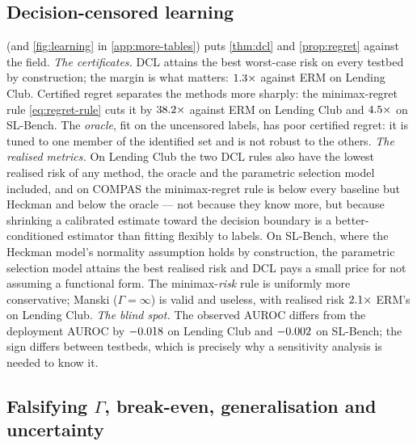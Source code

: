 \subsection{Decision-censored learning}
\label{sec:exp-learning}



 (and \cref{fig:learning} in \cref{app:more-tables}) puts \cref{thm:dcl} and
\cref{prop:regret} against the field. \emph{The certificates.} DCL attains the
best worst-case risk on every testbed by construction; the margin is what
matters: $1.3\times$ against ERM on Lending Club.
Certified regret separates the methods more sharply: the minimax-regret rule
\eqref{eq:regret-rule} cuts it by $38.2\times$ against
ERM on Lending Club and $4.5\times$ on SL-Bench.
The \emph{oracle}, fit on the uncensored labels, has poor certified regret: it
is tuned to one member of the identified set and is not robust to the others.
\emph{The realised metrics.} On Lending Club the two DCL rules also have the
lowest realised risk of any method, the oracle and the parametric selection
model included, and on COMPAS the minimax-regret rule is below every
baseline but Heckman and below the oracle --- not because they know more, but
because shrinking a calibrated estimate toward the decision boundary is a
better-conditioned estimator than fitting flexibly to labels. On SL-Bench, where the Heckman model's normality
assumption holds by construction, the parametric selection model attains the
best realised risk and DCL pays a small price for not assuming a functional
form. The minimax-\emph{risk} rule is uniformly more conservative; Manski
($\Gamma=\infty$) is valid and useless, with realised risk
$2.1\times$ ERM's on Lending Club.
\emph{The blind spot.} The observed AUROC differs from the deployment AUROC by
$-0.018$ on Lending Club and
$-0.002$ on SL-Bench; the sign differs between
testbeds, which is precisely why a sensitivity analysis is needed to know it.



\subsection{Falsifying $\Gamma$, break-even, generalisation and uncertainty}
\label{sec:exp-rest}



